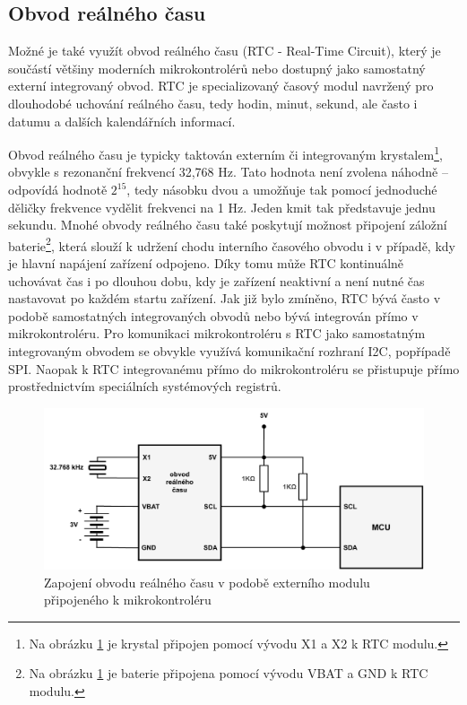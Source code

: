\subsection{Obvod reálného času}
\label{real_time_circuit}
Možné je také využít obvod reálného času (RTC - Real-Time Circuit), který je součástí většiny moderních mikrokontrolérů nebo dostupný jako samostatný externí integrovaný obvod. RTC je specializovaný časový modul navržený pro dlouhodobé uchování reálného času, tedy hodin, minut, sekund, ale často i datumu a dalších kalendářních informací.

Obvod reálného času je typicky taktován externím či integrovaným krystalem\footnote{Na obrázku \ref{fig:real-time-circuit} je krystal připojen pomocí vývodu X1 a X2 k RTC modulu.}, obvykle s rezonanční frekvencí 32,768 Hz. Tato hodnota není zvolena náhodně – odpovídá hodnotě $2^{15}$, tedy násobku dvou a umožňuje tak pomocí jednoduché děličky frekvence vydělit frekvenci na 1 Hz. Jeden kmit tak představuje jednu sekundu. Mnohé obvody reálného času také poskytují možnost připojení záložní baterie\footnote{Na obrázku \ref{fig:real-time-circuit} je baterie připojena pomocí vývodu VBAT a GND k RTC modulu.}, která slouží k udržení chodu interního časového obvodu i v případě, kdy je hlavní napájení zařízení odpojeno. Díky tomu může RTC kontinuálně uchovávat čas i po dlouhou dobu, kdy je zařízení neaktivní a není nutné čas nastavovat po každém startu zařízení. Jak již bylo zmíněno, RTC bývá často v podobě samostatných integrovaných obvodů nebo bývá integrován přímo v mikrokontroléru. Pro komunikaci mikrokontroléru s RTC jako samostatným integrovaným obvodem se obvykle využívá komunikační rozhraní I2C, popřípadě SPI. Naopak k RTC integrovanému přímo do mikrokontroléru se přistupuje přímo prostřednictvím speciálních systémových registrů. \cite{jameco_choosing_right_real_time_clock_chip_or_module, yxc_role_of_32768_freq_in_the_circuit, medium_rtc}

\newpage

\begin{figure}[h]
    \centering
    \includegraphics[width=1.00\textwidth]{obrazky-figures/real_time_circuit.pdf}
    
    \caption{Zapojení obvodu reálného času v podobě externího modulu připojeného k mikrokontroléru \cite{embed_journal_interfacing_rtc_with_microcontroler}}
    \label{fig:real-time-circuit}
\end{figure}

